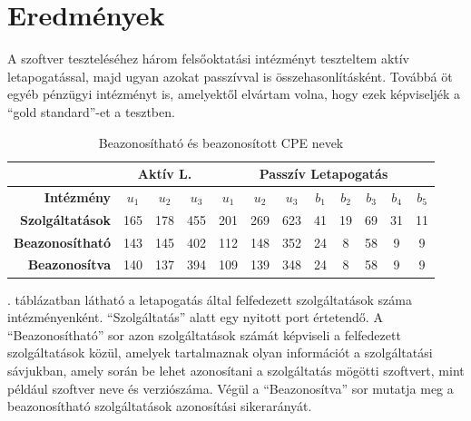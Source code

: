 \documentclass[a4paper,12pt]{article}
\begin{document}
\section{Eredmények}

	A szoftver teszteléséhez három felsőoktatási intézményt teszteltem aktív letapogatással, majd ugyan azokat passzívval is összehasonlításként. Továbbá öt egyéb pénzügyi intézményt is, amelyektől elvártam volna, hogy ezek képviseljék a ``gold standard''-et a tesztben.

	\begin{table}[H]
		\centering
		\begin{tabular}{r|ccc|ccc|ccccc|}
			\cline{2-12}
			\multicolumn{1}{l|}{}                         & \multicolumn{3}{c|}{\textbf{Aktív L.}} & \multicolumn{8}{c|}{\textbf{Passzív Letapogatás}}                                                             \\ \hline
			\multicolumn{1}{|r|}{\textbf{Intézmény}}      & \textbf{$u_1$}    & \textbf{$u_2$}    & \textbf{$u_3$}   & \textbf{$u_1$} & \textbf{$u_2$} & \textbf{$u_3$} & \textbf{$b_1$} & \textbf{$b_2$} & \textbf{$b_3$} & \textbf{$b_4$} & \textbf{$b_5$} \\ \hline
			\multicolumn{1}{|r|}{\textbf{Szolgáltatások}} & 165            & 178            & 455           & 201         & 269         & 623         & 41          & 19          & 69          & 31          & 11          \\
			\multicolumn{1}{|r|}{\textbf{Beazonosítható}} & 143            & 145            & 402           & 112         & 148         & 352         & 24          & 8           & 58          & 9           & 9           \\
			\multicolumn{1}{|r|}{\textbf{Beazonosítva}}   & 140            & 137            & 394           & 109         & 139         & 348         & 24          & 8           & 58          & 9           & 9           \\ \hline
		\end{tabular}
		\caption{Beazonosítható és beazonosított CPE nevek}
		\label{cpeids}
	\end{table}
	
	\Az{\ref{cpeids}}. táblázatban látható a letapogatás által felfedezett szolgáltatások száma intézményenként. ``Szolgáltatás'' alatt egy nyitott port értetendő. A ``Beazonosítható'' sor azon szolgáltatások számát képviseli a felfedezett szolgáltatások közül, amelyek tartalmaznak olyan információt a szolgáltatási sávjukban, amely során be lehet azonosítani a szolgáltatás mögötti szoftvert, mint például szoftver neve és verziószáma. Végül a ``Beazonosítva'' sor mutatja meg a beazonosítható szolgáltatások azonosítási sikerarányát.
	
\end{document}
